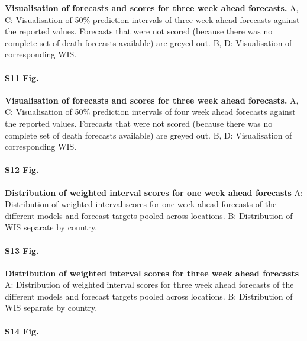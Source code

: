 \documentclass[10pt,letterpaper]{article}
\begin{document}
\textbf{Visualisation of forecasts and scores for three week ahead forecasts.}
A, C: Visualisation of 50\% prediction intervals of three week ahead
forecasts against the reported values. Forecasts that were not scored
(because there was no complete set of death forecasts available) are
greyed out. B, D: Visualisation of corresponding WIS.

\paragraph{S11 Fig.}
\label{fig:forecasts-and-truth-4}

\textbf{Visualisation of forecasts and scores for three week ahead forecasts.}
A, C: Visualisation of 50\% prediction intervals of four week ahead
forecasts against the reported values. Forecasts that were not scored
(because there was no complete set of death forecasts available) are
greyed out. B, D: Visualisation of corresponding WIS.

\paragraph{S12 Fig.}
\label{fig:distribution-scores-1}

\textbf{Distribution of weighted interval scores for one week ahead forecasts}
A: Distribution of weighted interval scores for one week ahead forecasts
of the different models and forecast targets pooled across locations. B:
Distribution of WIS separate by country.

\paragraph{S13 Fig.}
\label{A: Distribution of weighted interval scores for three week ahead forecasts of the different models and forecast targets pooled across locations. B: Distribution of WIS separate by country.}

\textbf{Distribution of weighted interval scores for three week ahead forecasts}
A: Distribution of weighted interval scores for three week ahead
forecasts of the different models and forecast targets pooled across
locations. B: Distribution of WIS separate by country.

\paragraph{S14 Fig.}
\label{A: Distribution of weighted interval scores for four week ahead forecasts of the different models and forecast targets pooled across locations. B: Distribution of WIS separate by country.}
\end{document}
